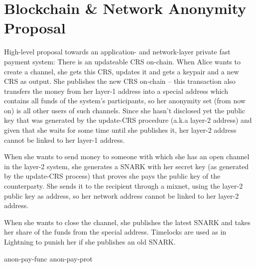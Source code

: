 \section{Blockchain \& Network Anonymity Proposal}
  \label{sec:app-net-anon}
  High-level proposal towards an application- and network-layer private fast
  payment system: There is an updateable CRS on-chain. When Alice wants to
  create a channel, she gets this CRS, updates it and gets a keypair and a new
  CRS as output. She publishes the new CRS on-chain -- this transaction also
  transfers the money from her layer-1 address into a special address which
  contains all funds of the system's participants, so her anonymity set (from
  now on) is all other users of such channels. Since she hasn't disclosed yet
  the public key that was generated by the update-CRS procedure (a.k.a layer-2
  address) and given that she waits for some time until she publishes it, her
  layer-2 address cannot be linked to her layer-1 address.

  When she wants to send money to someone with which she has an open channel in
  the layer-2 system, she generates a SNARK with her secret key (as generated by
  the update-CRS process) that proves she pays the public key of the
  counterparty. She sends it to the recipient through a mixnet, using the
  layer-2 public key as address, so her network address cannot be linked to her
  layer-2 address.

  When she wants to close the channel, she publishes the latest SNARK and takes
  her share of the funds from the special address. Timelocks are used as in
  Lightning to punish her if she publishes an old SNARK.

  {anon-pay-func}
  {anon-pay-prot}
